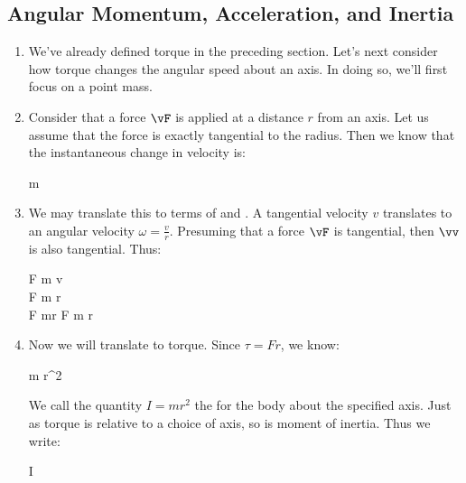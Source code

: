 \subsection{Angular Momentum, Acceleration, and Inertia}

\begin{enumerate}
  \item We've already defined torque in the preceding section. Let's
  next consider how torque changes the angular speed about an axis. In
  doing so, we'll first focus on a point mass.

  \item Consider that a force $\vF$ is applied at a distance $r$ from an
  axis. Let us assume that the force is exactly tangential to the
  radius. Then we know that the instantaneous change in velocity is:

  \begin{nedqn}
    \vF
  \eqcol
    m  \vv
  \end{nedqn}

  \item We may translate this to terms of  and
  . A tangential velocity $v$ translates to
  an angular velocity $\omega = \frac{v}{r}$. Presuming that a force
  $\vF$ is tangential, then $\vv$ is also tangential. Thus:

  \begin{nedqn}
    F
  \eqcol
    m  v
  \\
    F
  \eqcol
    m  \omega r
  \\
    F
  \eqcol
    mr  \omega
    F
  \eqcol
    m r \alpha
  \end{nedqn}

  \item Now we will translate to torque. Since $\tau = Fr$, we know:

  \begin{nedqn}
    \tau
  \eqcol
    m r^2 \alpha
  \end{nedqn}

  \noindent
  We call the quantity $I = m r^2$ the  for
  the body about the specified axis. Just as torque is relative to a
  choice of axis, so is moment of inertia. Thus we write:

  \begin{nedqn}
    \tau
  \eqcol
    I \alpha
  \end{nedqn}


\end{enumerate}
